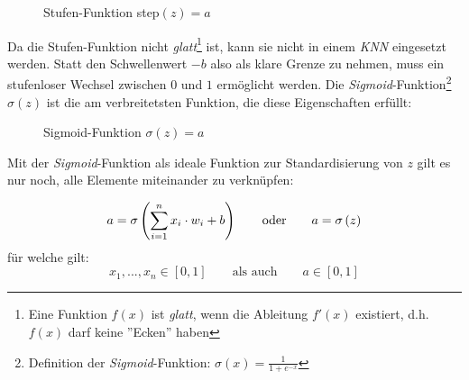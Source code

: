 \begin{figure}[h]
	\centering
	\caption[Stufen-Funktion]{Stufen-Funktion step$(z) = a$}
	\label{plt:step}
\end{figure}
Da die Stufen-Funktion nicht \textit{glatt}\footnote{Eine Funktion $f(x)$ ist \textit{glatt}, wenn die Ableitung $f'(x)$ existiert, d.h. $f(x)$ darf keine ''Ecken'' haben} ist, kann sie nicht in einem \textit{KNN} eingesetzt werden. Statt den Schwellenwert $-b$ also als klare Grenze zu nehmen, muss ein stufenloser Wechsel zwischen $0$ und $1$ ermöglicht werden. Die \textit{Sigmoid}-Funktion\footnote{Definition der \textit{Sigmoid}-Funktion: $\sigma(x) = \frac{1}{1+e^{-x}}$} $\sigma(z)$ ist die am verbreitetsten Funktion, die diese Eigenschaften erfüllt: 


\begin{figure}[h]
	\centering
	\caption[Sigmoid-Funktion]{Sigmoid-Funktion $\sigma(z) = a$}
	\label{plt:sigmoid}
\end{figure}
Mit der \textit{Sigmoid}-Funktion als ideale Funktion zur Standardisierung von $z$ gilt es nur noch, alle Elemente miteinander zu verknüpfen:


\begin{equation}\label{eq:neuron_eq}
a = \sigma \left( \sum_{i=1}^{n} x_i\cdot w_i+b\right)  \qquad \text{oder} \qquad a = \sigma \left( z \right)
\vspace*{2mm}
\end{equation}
für welche gilt:
\[x_1,...,x_n \in \left[0, 1\right] \qquad \text{als auch} \qquad a\in \left[0, 1\right] \]

